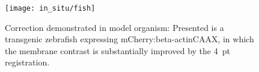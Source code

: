 \begin{figure}[h]
  \texttt{[image: in\_situ/fish]}
  \caption[Correction demonstrated in model organism]{Correction demonstrated in model organism:
  Presented is a transgenic \gls{zebrafish} expressing mCherry:beta-actinCAAX, in which the membrane contrast is substantially improved by the 4~pt registration.%
  }
  \label{fig:homofish}
\end{figure}


